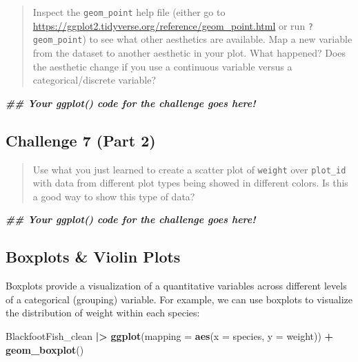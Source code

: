 \documentclass[
  10pt,
  letterpaper,
  twoside,
  openright]{book}
\newenvironment{Shaded}{\begin{snugshade}}{\end{snugshade}}
\newcommand{\AttributeTok}[1]{\textcolor[rgb]{0.13,0.29,0.53}{#1}}
\newcommand{\DocumentationTok}[1]{\textcolor[rgb]{0.56,0.35,0.01}{\textbf{\textit{#1}}}}
\newcommand{\FunctionTok}[1]{\textcolor[rgb]{0.13,0.29,0.53}{\textbf{#1}}}
\newcommand{\NormalTok}[1]{#1}
\newcommand{\SpecialCharTok}[1]{\textcolor[rgb]{0.81,0.36,0.00}{\textbf{#1}}}
\begin{document}
\begin{quote}
Inspect the \texttt{geom\_point} help file (either go to
\url{https://ggplot2.tidyverse.org/reference/geom_point.html} or run
\texttt{?geom\_point}) to see what other aesthetics are available. Map a
new variable from the dataset to another aesthetic in your plot. What
happened? Does the aesthetic change if you use a continuous variable
versus a categorical/discrete variable?
\end{quote}

\begin{Shaded}
\begin{Highlighting}[]
\DocumentationTok{\#\# Your ggplot() code for the challenge goes here!}
\end{Highlighting}
\end{Shaded}

\hypertarget{challenge-7-part-2}{%
\subsection{Challenge 7 (Part 2)}\label{challenge-7-part-2}}

\begin{quote}
Use what you just learned to create a scatter plot of \texttt{weight}
over \texttt{plot\_id} with data from different plot types being showed
in different colors. Is this a good way to show this type of data?
\end{quote}

\begin{Shaded}
\begin{Highlighting}[]
\DocumentationTok{\#\# Your ggplot() code for the challenge goes here!}
\end{Highlighting}
\end{Shaded}

\hypertarget{boxplots-violin-plots}{%
\subsection{Boxplots \& Violin Plots}\label{boxplots-violin-plots}}

Boxplots provide a visualization of a quantitative variables across
different levels of a categorical (grouping) variable. For example, we
can use boxplots to visualize the distribution of weight within each
species:

\begin{Shaded}
\begin{Highlighting}[]
\NormalTok{BlackfootFish\_clean }\SpecialCharTok{|\textgreater{}}
  \FunctionTok{ggplot}\NormalTok{(}\AttributeTok{mapping =} \FunctionTok{aes}\NormalTok{(}\AttributeTok{x =}\NormalTok{ species, }\AttributeTok{y =}\NormalTok{ weight)) }\SpecialCharTok{+}
    \FunctionTok{geom\_boxplot}\NormalTok{()}
\end{Highlighting}
\end{Shaded}
\end{document}
